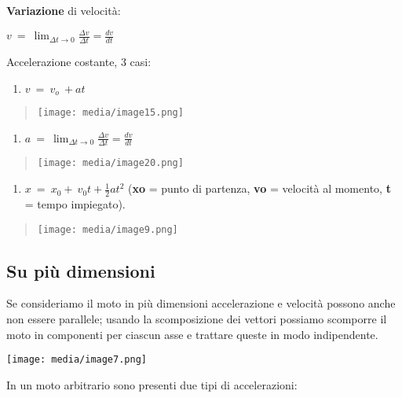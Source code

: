 \textbf{Variazione} di velocità:

\(v\  = \ \lim_{\Delta t \rightarrow 0}\frac{\Delta v}{\Delta t} = \frac{dv}{dt}\)

Accelerazione costante, 3 casi:

\begin{enumerate}
\def\labelenumi{\arabic{enumi}.}
\item
  \(v\  = \ v_{o}\  + at\)
\end{enumerate}

\begin{quote}
\texttt{[image: media/image15.png]}
\end{quote}

\begin{enumerate}
\def\labelenumi{\arabic{enumi}.}
\setcounter{enumi}{1}
\item
  \(a\  = \ \lim_{\Delta t \rightarrow 0}\frac{\Delta v}{\Delta t} = \frac{dv}{dt}\)
\end{enumerate}

\begin{quote}
\texttt{[image: media/image20.png]}
\end{quote}

\begin{enumerate}
\def\labelenumi{\arabic{enumi}.}
\setcounter{enumi}{2}
\item
  \(x\  = \ x_{0} + \ v_{0}t + \frac{1}{2}at^{2}\) (\textbf{xo} = punto
  di partenza, \textbf{vo} = velocità al momento, \textbf{t} = tempo
  impiegato).
\end{enumerate}

\begin{quote}
\texttt{[image: media/image9.png]}
\end{quote}

\subsection{Su più dimensioni}\label{su-piuxf9-dimensioni}

Se consideriamo il moto in più dimensioni accelerazione e velocità
possono anche non essere parallele; usando la scomposizione dei vettori
possiamo scomporre il moto in componenti per ciascun asse e trattare
queste in modo indipendente.

\texttt{[image: media/image7.png]}

In un moto arbitrario sono presenti due tipi di accelerazioni:

